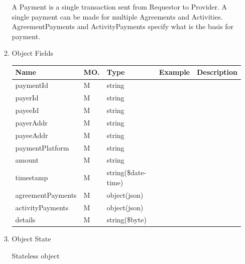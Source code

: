 \begin{enumerate}
\begin{enumerate}
A Payment is a single transaction sent from Requestor to Provider. 
A single payment can be made for multiple Agreements and Activities. 
AgreementPayments and ActivityPayments specify what is the basis for payment.

\item Object Fields

\begin{center}
\begin{tabular}{|p{3cm}|l|p{3cm}|p{3cm}|p{4cm}|} 
\hline
\rowcolor{lightgray}	Name	& MO.	& Type	& Example & 	Description \\
\hline


paymentId			& M & string				&							&							\\
\hline

payerId				& M & string				&							&							\\
\hline

payeeId				& M & string				&							&							\\
\hline

payerAddr			& M & string				&							&							\\
\hline

payeeAddr			& M & string				&							&							\\
\hline

paymentPlatform		& M & string				&							&							\\
\hline

amount				& M & string				&							&							\\
\hline

timestamp			& M & string(\$date-time)	&							&							\\
\hline

agreementPayments	& M & object(json)			&							&							\\
\hline

activityPayments	& M & object(json)			&							&							\\
\hline
	
details				& M & string(\$byte)		&							&							\\
\hline

\end{tabular}
\end{center}

\item Object State

Stateless object

\end{enumerate}

\end{enumerate}

